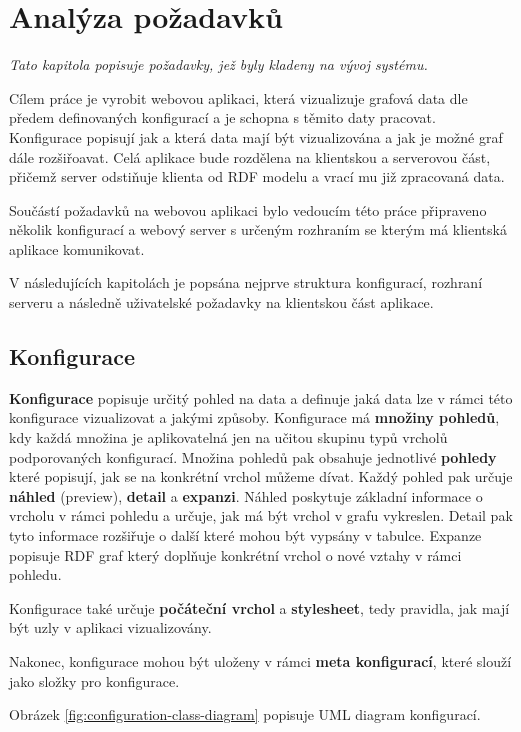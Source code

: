 \chapter{Analýza požadavků}

\textit{Tato kapitola popisuje požadavky, jež byly kladeny na vývoj systému.}

Cílem práce je vyrobit webovou aplikaci, která vizualizuje grafová data dle předem definovaných konfigurací a je schopna s těmito daty pracovat. Konfigurace popisují jak a která data mají být vizualizována a jak je možné graf dále rozšiřoavat. Celá aplikace bude rozdělena na klientskou a serverovou část, přičemž server odstiňuje klienta od RDF modelu a vrací mu již zpracovaná data.

Součástí požadavků na webovou aplikaci bylo vedoucím této práce připraveno několik konfigurací a webový server s určeným rozhraním se kterým má klientská aplikace komunikovat.

V následujících kapitolách je popsána nejprve struktura konfigurací, rozhraní serveru a následně uživatelské požadavky na klientskou část aplikace.

\section{Konfigurace}

\textbf{Konfigurace} popisuje určitý pohled na data a definuje jaká data lze v rámci této konfigurace vizualizovat a jakými způsoby. Konfigurace má \textbf{množiny pohledů}, kdy každá množina je aplikovatelná jen na učitou skupinu typů vrcholů podporovaných konfigurací. Množina pohledů pak obsahuje jednotlivé \textbf{pohledy} které popisují, jak se na konkrétní vrchol můžeme dívat. Každý pohled pak určuje \textbf{náhled} (preview), \textbf{detail}  a \textbf{expanzi}. Náhled poskytuje základní informace o vrcholu v rámci pohledu a určuje, jak má být vrchol v grafu vykreslen. Detail pak tyto informace rozšiřuje o další které mohou být vypsány v tabulce. Expanze popisuje RDF graf který doplňuje konkrétní vrchol o nové vztahy v rámci pohledu.

Konfigurace také určuje \textbf{počáteční vrchol} a \textbf{stylesheet}, tedy pravidla, jak mají být uzly v aplikaci vizualizovány.

Nakonec, konfigurace mohou být uloženy v rámci \textbf{meta konfigurací}, které slouží jako složky pro konfigurace.

Obrázek \ref{fig:configuration-class-diagram} popisuje UML diagram konfigurací.

